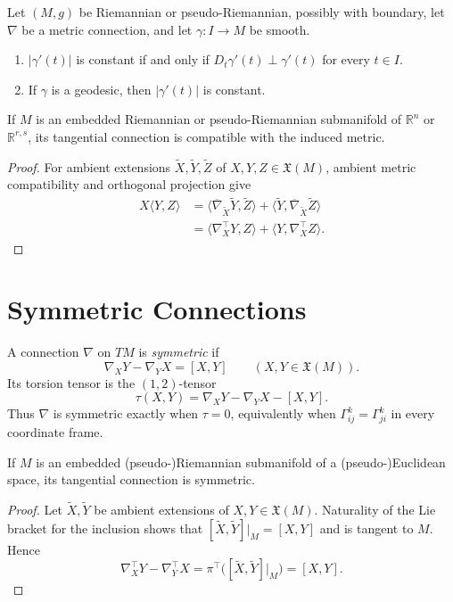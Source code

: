 \begin{corollary}
\label{cor:metric-connection-norm-geodesic}

Let $(M,g)$ be Riemannian or pseudo-Riemannian, possibly with boundary, let
$\nabla$ be a metric connection, and let $\gamma:I\to M$ be smooth.
\begin{enumerate}
\item[(a)] $|\gamma'(t)|$ is constant if and only if
$D_t\gamma'(t)\perp\gamma'(t)$ for every $t\in I$.
\item[(b)] If $\gamma$ is a geodesic, then $|\gamma'(t)|$ is constant.
\end{enumerate}
\end{corollary}

\begin{proposition}
\label{prop:tangential-connection-compatible-metric}

If $M$ is an embedded Riemannian or pseudo-Riemannian submanifold of
$\mathbb R^n$ or $\mathbb R^{r,s}$, its tangential connection is compatible
with the induced metric.

\begin{proof}
\sketch For ambient extensions $\widetilde X,\widetilde Y,\widetilde Z$ of
$X,Y,Z\in\mathfrak X(M)$, ambient metric compatibility and orthogonal
projection give
\begin{align*}
X\langle Y,Z\rangle
&=\langle\overline\nabla_{\widetilde X}\widetilde Y,\widetilde Z\rangle
 +\langle\widetilde Y,\overline\nabla_{\widetilde X}\widetilde Z\rangle\\
&=\langle\nabla_X^\top Y,Z\rangle+\langle Y,\nabla_X^\top Z\rangle.
\end{align*}
\end{proof}
\end{proposition}

\section{Symmetric Connections}

A connection $\nabla$ on $TM$ is \emph{symmetric} if
\[
\nabla_XY-\nabla_YX=[X,Y]
\qquad(X,Y\in\mathfrak X(M)).
\]
Its torsion tensor is the $(1,2)$-tensor
\[
\tau(X,Y)=\nabla_XY-\nabla_YX-[X,Y].
\]
Thus $\nabla$ is symmetric exactly when $\tau=0$, equivalently when
$\Gamma^k_{ij}=\Gamma^k_{ji}$ in every coordinate frame.

\begin{proposition}
\label{prop:tangential-connection-symmetric}

If $M$ is an embedded (pseudo-)Riemannian submanifold of a
(pseudo-)Euclidean space, its tangential connection is symmetric.

\begin{proof}
\sketch Let $\widetilde X,\widetilde Y$ be ambient extensions of
$X,Y\in\mathfrak X(M)$. Naturality of the Lie bracket for the inclusion shows
that $[\widetilde X,\widetilde Y]|_M=[X,Y]$ and is tangent to $M$. Hence
\[
\nabla_X^\top Y-\nabla_Y^\top X
=\pi^\top\bigl([\widetilde X,\widetilde Y]|_M\bigr)=[X,Y].
\]
\end{proof}
\end{proposition}

